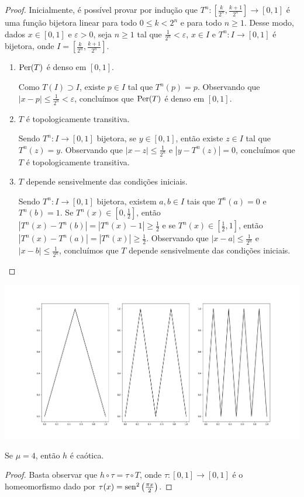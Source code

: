 \begin{proof}
Inicialmente, é possível provar por indução que $T^n: [\frac{k}{2^n}, \frac{k+1}{2^n}] \to [0,1]$ é uma função bijetora linear para todo $0 \leq k  < 2^n$ e para todo $n \geq 1$.
Desse modo, dados $x \in [0, 1]$ e $\varepsilon > 0$, seja $n \geq 1$ tal que $\frac{1}{2^n} < \varepsilon$, $x \in I$ e $T^n: I \to [0,1]$ é bijetora, onde $I = \left[\frac{k}{2^n}, \frac{k+1}{2^n}\right]$.

\begin{enumerate}[label=\alph*)]
\item $\operatorname{Per}(T)$ é denso em $[0, 1]$.

Como $T(I) \supset I$, existe $p \in I$ tal que $T^n(p) = p$. Observando que $|x-p| \leq \frac{1}{2^n} < \varepsilon$, concluímos que $\operatorname{Per}(T)$ é denso em $[0, 1]$.

\item $T$ é topologicamente transitiva.

Sendo $T^n: I \to [0,1]$ bijetora, se $y \in [0, 1]$, então existe $z \in I$ tal que $T^n(z) = y$.
Observando que $|x - z| \leq \frac{1}{2^n}$ e $|y - T^n(z)| = 0$, concluímos que $T$ é topologicamente transitiva.

\item $T$ depende sensivelmente das condições iniciais.

Sendo $T^n: I \to [0,1]$ bijetora, existem $a, b \in I$ tais que $T^n(a) = 0$ e $T^n(b) = 1$. Se $T^n(x) \in [0, \frac{1}{2}]$, então $|T^n(x) - T^n(b)| = |T^n(x) - 1| \geq \frac{1}{2}$ e se $T^n(x) \in [\frac{1}{2}, 1]$, então $|T^n(x) - T^n(a)| = |T^n(x)| \geq \frac{1}{2}$. Observando que $|x - a| \leq \frac{1}{2^n}$ e $|x - b| \leq \frac{1}{2^n}$, concluímos que $T$ depende sensivelmente das condições iniciais.
\end{enumerate}
\end{proof}

\begin{center}
\includegraphics[scale=0.3]{images/tent-map.png}
\end{center}

\begin{theorem}
Se $\mu = 4$, então $h$ é caótica.
\end{theorem}

\begin{proof}
Basta observar que $h \circ \tau = \tau \circ T$, onde $\tau: [0, 1] \to [0, 1]$ é o homeomorfismo dado por $\tau(x) = \operatorname{sen}^2\left(\frac{\pi x}{2}\right)$.
\end{proof}
